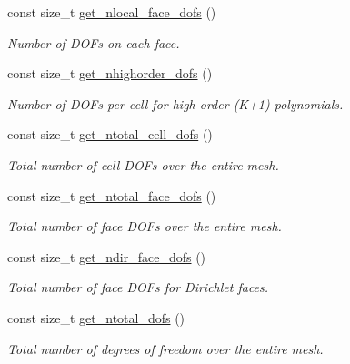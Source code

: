 \begin{DoxyCompactItemize}
const size\+\_\+t \hyperlink{classHArDCore3D_1_1HHO__Diffusion_a81f57d9aa97bcac14dbd4e0fc378bd46}{get\+\_\+nlocal\+\_\+face\+\_\+dofs} ()
\begin{DoxyCompactList}\small\item\em Number of D\+O\+Fs on each face. \end{DoxyCompactList}\item 
\mbox{\label{classHArDCore3D_1_1HHO__Diffusion_abfc762c3cf9a0bbaf6f7d24512352e31}} 
const size\+\_\+t \hyperlink{classHArDCore3D_1_1HHO__Diffusion_abfc762c3cf9a0bbaf6f7d24512352e31}{get\+\_\+nhighorder\+\_\+dofs} ()
\begin{DoxyCompactList}\small\item\em Number of D\+O\+Fs per cell for high-\/order (K+1) polynomials. \end{DoxyCompactList}\item 
\mbox{\label{classHArDCore3D_1_1HHO__Diffusion_adbbbcb3f31c94640fd926fb24cfc75c7}} 
const size\+\_\+t \hyperlink{classHArDCore3D_1_1HHO__Diffusion_adbbbcb3f31c94640fd926fb24cfc75c7}{get\+\_\+ntotal\+\_\+cell\+\_\+dofs} ()
\begin{DoxyCompactList}\small\item\em Total number of cell D\+O\+Fs over the entire mesh. \end{DoxyCompactList}\item 
\mbox{\label{classHArDCore3D_1_1HHO__Diffusion_a22ff2e589a8b847354666ea2f9397b5b}} 
const size\+\_\+t \hyperlink{classHArDCore3D_1_1HHO__Diffusion_a22ff2e589a8b847354666ea2f9397b5b}{get\+\_\+ntotal\+\_\+face\+\_\+dofs} ()
\begin{DoxyCompactList}\small\item\em Total number of face D\+O\+Fs over the entire mesh. \end{DoxyCompactList}\item 
\mbox{\label{classHArDCore3D_1_1HHO__Diffusion_a2e582a2d0dbd25ade261d160c32aa504}} 
const size\+\_\+t \hyperlink{classHArDCore3D_1_1HHO__Diffusion_a2e582a2d0dbd25ade261d160c32aa504}{get\+\_\+ndir\+\_\+face\+\_\+dofs} ()
\begin{DoxyCompactList}\small\item\em Total number of face D\+O\+Fs for Dirichlet faces. \end{DoxyCompactList}\item 
\mbox{\label{classHArDCore3D_1_1HHO__Diffusion_a9564d2be867b683e002bb555d397ed09}} 
const size\+\_\+t \hyperlink{classHArDCore3D_1_1HHO__Diffusion_a9564d2be867b683e002bb555d397ed09}{get\+\_\+ntotal\+\_\+dofs} ()
\begin{DoxyCompactList}\small\item\em Total number of degrees of freedom over the entire mesh. \end{DoxyCompactList}\end{DoxyCompactItemize}


